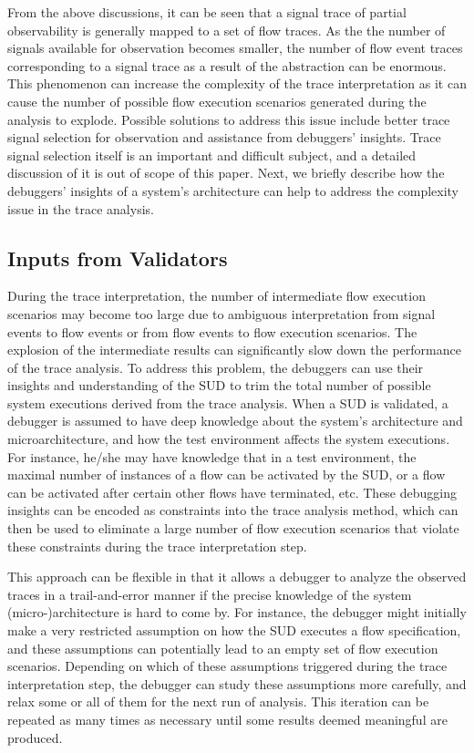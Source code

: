 \documentclass[conference]{IEEEtran}
\begin{document}
From the above discussions, it can be seen that a signal trace of partial observability is generally mapped to a set of flow traces.  As the the number of signals available for observation becomes smaller, the number of flow event traces corresponding to a signal trace as a result of the abstraction can be enormous.  This phenomenon can increase the complexity of the trace interpretation as it can cause the number of possible flow execution scenarios generated during the analysis to explode.   Possible solutions to address this issue include better trace signal selection for observation and assistance from debuggers' insights.  Trace signal selection itself is an important and difficult subject, and a detailed discussion of it is out of scope of this paper.   Next, we briefly describe how the debuggers' insights of a system's architecture can help to address the complexity issue in the trace analysis.


\subsection{Inputs from Validators}

During the trace interpretation, the number of intermediate flow execution scenarios may become too large due to ambiguous interpretation from signal events to flow events or from flow events to flow execution scenarios.  The explosion of the intermediate results can significantly slow down the performance of the trace analysis.  To address this problem, the debuggers can use their insights and understanding of the SUD to trim the total number of possible system executions derived from the trace analysis.  When a SUD is validated, a debugger is assumed to have deep knowledge about the system's architecture and microarchitecture, and how the test environment affects the system executions.  For instance, he/she may have knowledge that in a test environment, the maximal number of instances of a flow can be activated by the SUD, or a flow can be activated after certain other flows have terminated, etc.  These debugging insights can be encoded as constraints into the trace analysis method, which can then be used to eliminate a large number of flow execution scenarios that violate these constraints during the trace interpretation step.

This approach can be flexible in that it allows a debugger to analyze the observed traces in a trail-and-error manner if the precise knowledge of the system (micro-)architecture is hard to come by.  For instance, the debugger might initially make a very restricted assumption on how the SUD executes a flow specification, and these assumptions can potentially lead to an empty set of flow execution scenarios.  Depending on which of these assumptions triggered during the trace interpretation step, the debugger can study these assumptions more carefully, and relax some or all of them for the next run of analysis.  This iteration can be repeated as many times as necessary until some results deemed meaningful are produced.
\end{document}
